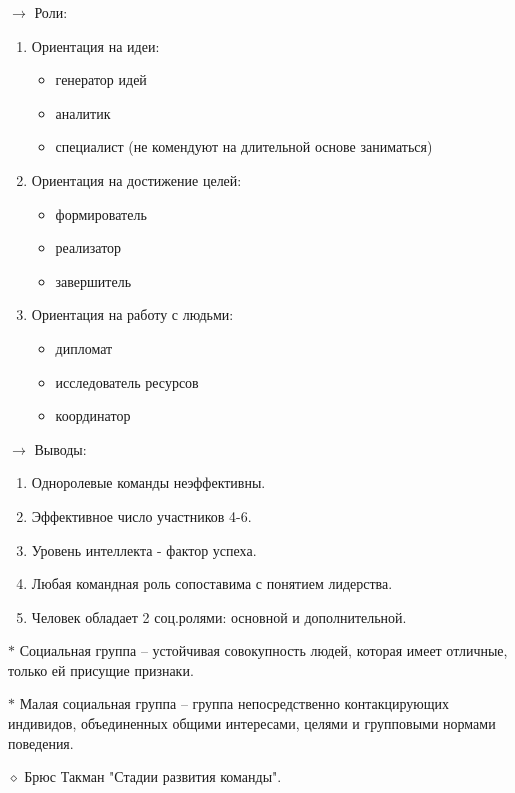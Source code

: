 \documentclass[12pt,a4paper]{report}
\begin{document}
\medskip 
$\rightarrow$ Роли:
\begin{enumerate}
	\item Ориентация на идеи:
	\begin{itemize}
		\item генератор идей
		\item аналитик
		\item специалист (не комендуют на длительной основе заниматься)
	\end{itemize}
	\item Ориентация на достижение целей:
	\begin{itemize}
		\item формирователь
		\item реализатор
		\item завершитель
	\end{itemize}
	\item Ориентация на работу с людьми:
	\begin{itemize}
		\item дипломат
		\item исследователь ресурсов
		\item координатор
	\end{itemize}
\end{enumerate}

\medskip 
$\rightarrow$ Выводы:
\begin{enumerate}
	\item Одноролевые команды неэффективны.
	\item Эффективное число участников 4-6.
	\item Уровень интеллекта - фактор успеха.
	\item Любая командная роль сопоставима с понятием лидерства.
	\item Человек обладает 2 соц.ролями: основной и дополнительной.
\end{enumerate}

\bigskip
$\ast$ Социальная группа -- устойчивая совокупность людей, которая имеет отличные, только ей присущие признаки.

\medskip 
$\ast$ Малая социальная группа -- группа непосредственно контакцирующих индивидов, объединенных общими интересами, целями и групповыми нормами поведения.

\bigskip 
$\diamond$ Брюс Такман "Стадии развития команды".
\end{document}
